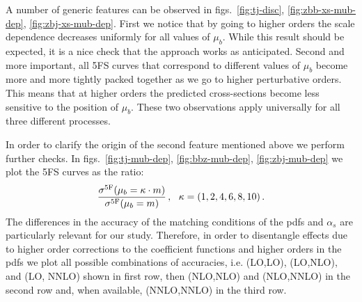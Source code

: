 \documentclass[letter,11pt]{article}
\def\as{\alpha_s}
\def\mub{\mu_b}
\def\k{\kappa}
\begin{document}
A number of generic features can be observed in figs.~\ref{fig:tj-disc}, \ref{fig:zbb-xs-mub-dep}, \ref{fig:zbj-xs-mub-dep}. First we notice that by going to higher orders the scale dependence decreases uniformly for all values of $\mub$. While this result should be expected, it is a nice check that the approach works as anticipated. Second and more important, all 5FS curves that correspond to different values of $\mub$ become more and more tightly packed together as we go to higher perturbative orders. This means that at higher orders the predicted cross-sections become less sensitive to the position of $\mub$. These two observations apply universally for all three different processes.

In order to clarify the origin of the second feature mentioned above we perform further checks. In figs.~\ref{fig:tj-mub-dep}, \ref{fig:bbz-mub-dep}, \ref{fig:zbj-mub-dep} we plot the 5FS curves as the ratio:
%
\begin{equation}
{\sigma^{\rm 5F}(\mub=\k\cdot m) \over \sigma^{\rm 5F}(\mub=m)}\,,~~\k=(1,2,4,6,8,10)\,.
\label{eq:ratio}
\end{equation}
%
The differences in the accuracy of the matching conditions of the pdfs and $\as$ are particularly relevant for our study. Therefore, in order to disentangle effects due to higher order corrections to the coefficient functions and higher orders in the pdfs we plot all possible combinations of accuracies, i.e. (LO,LO), (LO,NLO), and (LO, NNLO) shown in first row, then (NLO,NLO) and (NLO,NNLO) in the second row and, when available, (NNLO,NNLO) in the third row. 
\end{document}
